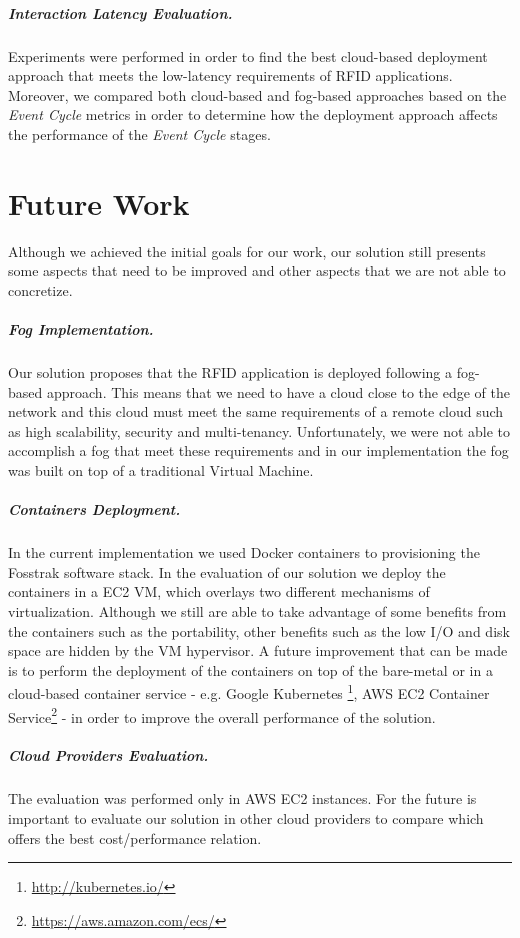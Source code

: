 \subparagraph{Interaction Latency Evaluation.}
\label{subp:event_latency_performance_eval}
Experiments were performed in order to find the best cloud-based deployment approach that meets the
low-latency requirements of \gls{RFID} applications. Moreover, we compared both cloud-based and fog-based
approaches based on the \textit{Event Cycle} metrics in order to determine how the deployment
approach affects the performance of the \textit{Event Cycle} stages.

\section{Future Work}
\label{sec:future_work}
Although we achieved the initial goals for our work, our solution still presents some aspects that
need to be improved and other aspects that we are not able to concretize.

\subparagraph{Fog Implementation.}
\label{subp:fog_impl}
Our solution proposes that the \gls{RFID} application is deployed following a fog-based approach.
This means that we need to have a cloud close to the edge of the network and this cloud must meet
the same requirements of a remote cloud such as high scalability, security and multi-tenancy.
Unfortunately, we were not able to accomplish a fog that meet these requirements and in our implementation
the fog was built on top of a traditional Virtual Machine.

\subparagraph{Containers Deployment.}
\label{subp:containers_impl}
In the current implementation we used Docker containers to provisioning the Fosstrak software stack.
In the evaluation of our solution we deploy the containers in a \gls{EC2} \gls{VM}, which overlays two
different mechanisms of virtualization. Although we still are able to take advantage of some benefits
from the containers such as the portability, other benefits such as the low I/O and disk space are
hidden by the \gls{VM} hypervisor. A future improvement that can be made is to perform the deployment
of the containers on top of the bare-metal or in a cloud-based container service - e.g. Google Kubernetes
\footnote{\url{http://kubernetes.io/}}, \gls{AWS} \gls{EC2} Container Service\footnote{\url{https://aws.amazon.com/ecs/}} -
in order to improve the overall performance of the solution.

\subparagraph{Cloud Providers Evaluation.}
\label{subp:cloud_eval}
The evaluation was performed only in \gls{AWS} \gls{EC2} instances. For the future is important to
evaluate our solution in other cloud providers to compare which offers the best cost/performance
relation.

